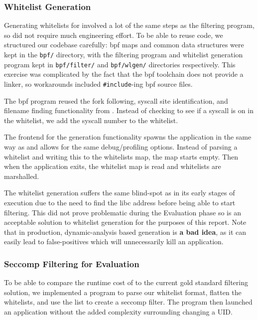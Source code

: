 \subsubsection{Whitelist Generation}\label{subsubsec:impl-whitelist-gen}

Generating whitelists for \af involved a lot of the same steps as the filtering
program, so did not require much engineering effort. To be able to reuse code,
we structured our codebase carefully: \ac{bpf} maps and common data structures
were kept in the \texttt{bpf/} directory, with the filtering program and
whitelist generation program kept in \texttt{bpf/filter/} and
\texttt{bpf/wlgen/} directories respectively. This exercise was complicated by
the fact that the \ac{bpf} toolchain does not provide a linker, so workarounds
included \texttt{\#include}-ing \ac{bpf} source files.

The \ac{bpf} program reused the fork following, syscall site identification, and
filename finding functionality from \afss. Instead of checking to see if a
syscall is on in the whitelist, we add the syscall number to the whitelist. 

The frontend for the generation functionality spawns the application in the same
way as \af and allows for the same debug/profiling options. Instead of parsing a
whitelist and writing this to the whitelists map, the map starts empty. Then
when the application exits, the whitelist map is read and whitelists are
marshalled.

The whitelist generation suffers the same blind-spot as \af in its early stages
of execution due to the need to find the \ac{libc} address before being able to
start filtering. This did not prove problematic during the Evaluation phase so
is an acceptable solution to whitelist generation for the purposes of this
report. Note that in production, dynamic-analysis based generation is \textbf{a
bad idea}, as it can easily lead to false-positives which will unnecessarily
kill an application.

\subsubsection{Seccomp Filtering for Evaluation}

To be able to compare the runtime cost of \af to the current gold standard
filtering solution, we implemented a program to parse our whitelist format,
flatten the whitelists, and use the list to create a seccomp filter. The program
then launched an application without the added complexity surrounding changing
a UID.

